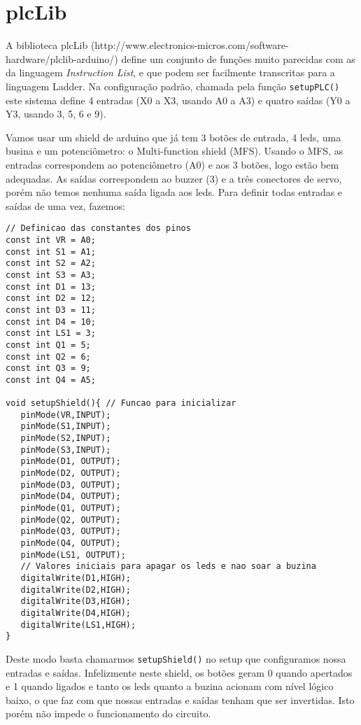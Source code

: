 \section{plcLib}

A biblioteca plcLib (http://www.electronics-micros.com/software-hardware/plclib-arduino/) define um conjunto de funções muito parecidas com as da linguagem \emph{Instruction List}, e que podem ser facilmente transcritas para a linguagem Ladder. Na configuração padrão, chamada pela função \lstinline|setupPLC()| este sistema define 4 entradas (X0 a X3, usando A0 a A3) e quatro saídas (Y0 a Y3, usando 3, 5, 6 e 9).

Vamos usar um shield de arduino que já tem 3 botões de entrada, 4 leds, uma busina e um potenciômetro: o Multi-function shield (MFS).
Usando o MFS, as entradas correspondem ao potenciômetro (A0) e aos 3 botões, logo estão bem adequadas. As saídas correspondem ao buzzer (3) e a três conectores de servo, porém não temos nenhuma saída ligada aos leds. Para definir todas entradas e saídas de uma vez, fazemos:
\begin{lstlisting}[caption=Definição de função e constantes para usar o o Multi-function Shield com o plcLib., label=lst:setupShield]
// Definicao das constantes dos pinos
const int VR = A0;
const int S1 = A1;
const int S2 = A2;
const int S3 = A3;
const int D1 = 13;
const int D2 = 12;
const int D3 = 11;
const int D4 = 10;
const int LS1 = 3;
const int Q1 = 5; 
const int Q2 = 6; 
const int Q3 = 9; 
const int Q4 = A5; 
 
void setupShield(){ // Funcao para inicializar
   pinMode(VR,INPUT);
   pinMode(S1,INPUT);
   pinMode(S2,INPUT);
   pinMode(S3,INPUT);
   pinMode(D1, OUTPUT);
   pinMode(D2, OUTPUT);
   pinMode(D3, OUTPUT);
   pinMode(D4, OUTPUT);
   pinMode(Q1, OUTPUT);
   pinMode(Q2, OUTPUT);
   pinMode(Q3, OUTPUT);
   pinMode(Q4, OUTPUT);
   pinMode(LS1, OUTPUT);
   // Valores iniciais para apagar os leds e nao soar a buzina
   digitalWrite(D1,HIGH); 
   digitalWrite(D2,HIGH);
   digitalWrite(D3,HIGH);
   digitalWrite(D4,HIGH);
   digitalWrite(LS1,HIGH);
}
\end{lstlisting}

Deste modo basta chamarmos \lstinline|setupShield()| no setup que configuramos nossa entradas e saídas. Infelizmente neste shield, os botões geram 0 quando apertados e 1 quando ligados e tanto os leds quanto a buzina acionam com nível lógico baixo, o que faz com que nossas entradas e saídas tenham que ser invertidas. Isto porém não impede o funcionamento do circuito.

